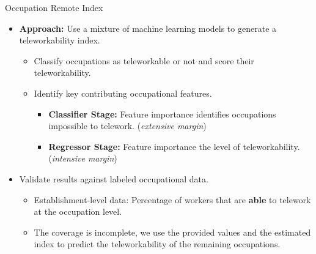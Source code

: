 \documentclass[aspectratio=1610]{beamer}
\begin{document}
\begin{frame}[label=empiric_remote_index1]{Occupation Remote Index}
    \begin{itemize}
        \item \textbf{Approach:} Use a mixture of machine learning models to generate a teleworkability index. \hyperlink{appendix_remote_index_details}{}%
        \begin{itemize}
            \item Classify occupations as teleworkable or not and score their teleworkability.
            \item Identify key contributing occupational features.%
            \begin{itemize}
                \item \textbf{Classifier Stage:} Feature importance identifies occupations impossible to telework. (\textit{extensive margin})\hyperlink{appendix_remote_index_performance_feature_importance_classifier}{}
                \item \textbf{Regressor Stage:} Feature importance the level of teleworkability. (\textit{intensive margin})\hyperlink{appendix_remote_index_performance_feature_importance_regressor}{}
            \end{itemize}
        \end{itemize}%
        \item Validate results against labeled occupational data. \vspace{0.3cm}
        \begin{itemize}
            \item Establishment-level data: Percentage of workers that are \textbf{able} to telework at the occupation level.
            \item The coverage is incomplete, we use the provided values and the estimated index to predict the teleworkability of the remaining occupations.
        \end{itemize}
    \end{itemize}
\end{frame}
        
\end{document}
